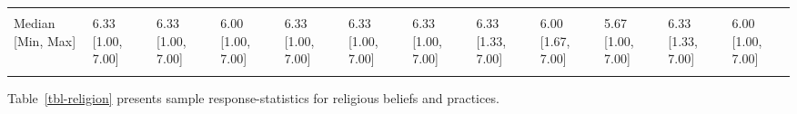 \documentclass[
  single column]{article}
\begin{document}
\begin{landscape}
\begin{longtable}[t]{llllllllllll}
\addlinespace
\cellcolor{gray!10}{Mean (SD)} & \cellcolor{gray!10}{5.92 (1.18)} & \cellcolor{gray!10}{6.06 (1.06)} & \cellcolor{gray!10}{5.74 (1.33)} & \cellcolor{gray!10}{6.01 (1.09)} & \cellcolor{gray!10}{6.06 (1.11)} & \cellcolor{gray!10}{6.06 (1.11)} & \cellcolor{gray!10}{5.90 (1.17)} & \cellcolor{gray!10}{5.86 (1.20)} & \cellcolor{gray!10}{5.55 (1.34)} & \cellcolor{gray!10}{6.01 (1.08)} & \cellcolor{gray!10}{5.80 (1.30)}\\
Median [Min, Max] & 6.33 [1.00, 7.00] & 6.33 [1.00, 7.00] & 6.00 [1.00, 7.00] & 6.33 [1.00, 7.00] & 6.33 [1.00, 7.00] & 6.33 [1.00, 7.00] & 6.33 [1.33, 7.00] & 6.00 [1.67, 7.00] & 5.67 [1.00, 7.00] & 6.33 [1.33, 7.00] & 6.00 [1.00, 7.00]\\
\cellcolor{gray!10}{Missing} & \cellcolor{gray!10}{117 (0.5\%)} & \cellcolor{gray!10}{7 (0.5\%)} & \cellcolor{gray!10}{4 (1.5\%)} & \cellcolor{gray!10}{15 (0.7\%)} & \cellcolor{gray!10}{22 (0.6\%)} & \cellcolor{gray!10}{11 (1.0\%)} & \cellcolor{gray!10}{1 (0.7\%)} & \cellcolor{gray!10}{3 (3.4\%)} & \cellcolor{gray!10}{1 (0.2\%)} & \cellcolor{gray!10}{7 (1.2\%)} & \cellcolor{gray!10}{5 (0.7\%)}\\*

\end{longtable}

\endgroup{}


\end{landscape}

\newpage{}

Table~\ref{tbl-religion} presents sample response-statistics for
religious beliefs and practices.
\end{document}
